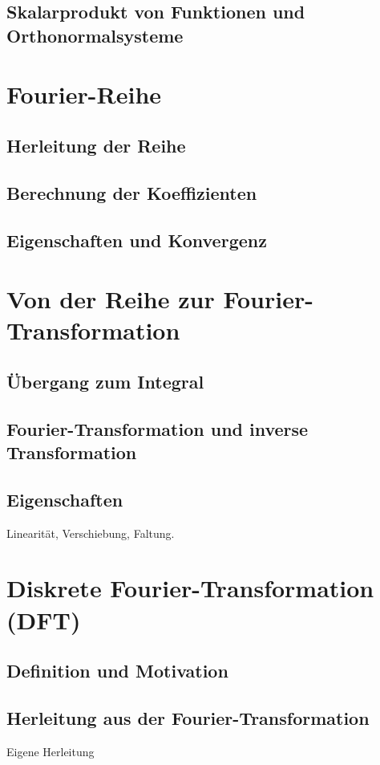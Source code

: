 \documentclass[a4paper,12pt]{article}
\begin{document}
\subsection{Skalarprodukt von Funktionen und Orthonormalsysteme}

\section{Fourier-Reihe}
\subsection{Herleitung der Reihe}
\subsection{Berechnung der Koeffizienten}
\subsection{Eigenschaften und Konvergenz}

\section{Von der Reihe zur Fourier-Transformation}
\subsection{Übergang zum Integral}
\subsection{Fourier-Transformation und inverse Transformation}
\subsection{Eigenschaften}
Linearität, Verschiebung, Faltung.

\section{Diskrete Fourier-Transformation (DFT)}
\subsection{Definition und Motivation}
\subsection{Herleitung aus der Fourier-Transformation}
Eigene Herleitung
\end{document}
